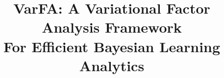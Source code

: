\documentclass{edm_article}
\begin{document}
\flushbottom

\title{VarFA: A Variational Factor Analysis Framework \\ For Efficient Bayesian Learning Analytics
}
%

%
%
%
%
\end{document}
